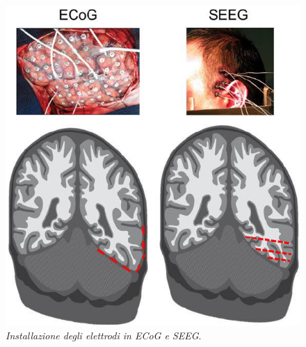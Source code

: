 \documentclass{report}
\numberwithin{equation}{section}
\numberwithin{figure}{section}
\begin{document}
\begin{figure}[htp]
    \centering
    \includegraphics[scale=0.75]{immagini/ecog.png}
    \caption{\label{fig:ecog} \textit{Installazione degli elettrodi in ECoG e SEEG}.}
\end{figure}
\end{document}
